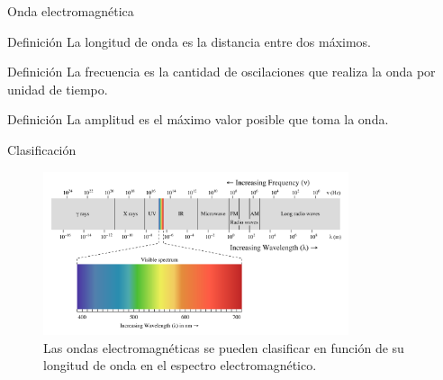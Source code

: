 \documentclass[]{beamer}
\begin{document}
\begin{frame}{Onda electromagnética}
  \begin{block}{Definición}
    La longitud de onda es la distancia entre dos máximos.
  \end{block}\pause
  \begin{block}{Definición}
    La frecuencia es la cantidad de oscilaciones que realiza la onda por unidad de tiempo.
  \end{block}\pause
  \begin{block}{Definición}
    La amplitud es el máximo valor posible que toma la onda.
  \end{block}
\end{frame}

\begin{frame}{Clasificación}
  \begin{figure}
    \includegraphics[width=0.8\textwidth]{espectrum.png}
    \caption{Las ondas electromagnéticas se pueden clasificar en función de su longitud de onda en el espectro electromagnético. }
  \end{figure}
\end{frame}
\end{document}
